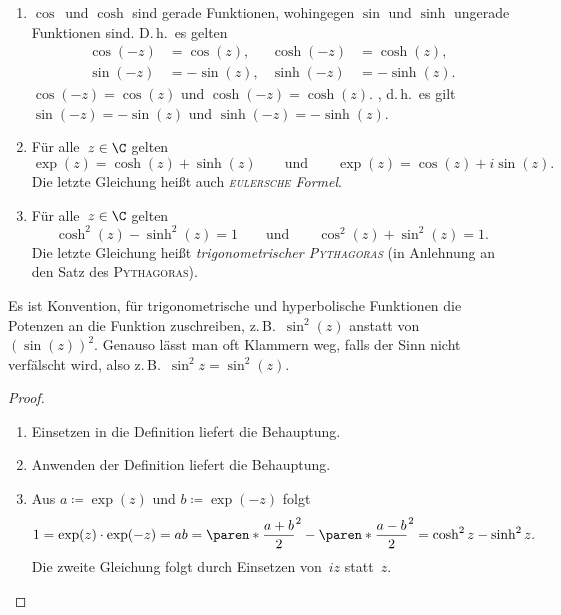\documentclass[a4paper]{article}
\begin{document}
\begin{proposition}\leavevmode
    \begin{enumerate}
        \item $\cos$~und $\cosh$ sind gerade Funktionen, wohingegen $\sin$ und $\sinh$ ungerade Funktionen sind. D.\,h.\ es gelten
              \begin{align*}
                  \cos(-z) & = \cos(z),  & \cosh(-z) & = \cosh(z),  \\
                  \sin(-z) & = -\sin(z), & \sinh(-z) & = -\sinh(z).
              \end{align*}
              $\cos(-z) = \cos(z)$ und $\cosh(-z) = \cosh(z)$. , d.\,h.\ es gilt $\sin(-z) = -\sin(z)$ und $\sinh(-z) = -\sinh(z)$.
        \item Für alle~$z \in \C$ gelten
              \begin{equation*}
                  \exp(z) = \cosh(z)+\sinh(z) \qquad\text{und}\qquad \exp(z) = \cos(z)+i\sin(z).
              \end{equation*}
              Die letzte Gleichung heißt auch \emph{\textsc{eulersche} Formel}.
        \item Für alle~$z \in \C$ gelten
              \begin{equation*}
                  \cosh^2(z) - \sinh^2(z) = 1 \qquad\text{und}\qquad \cos^2(z) + \sin^2(z) = 1.
              \end{equation*}
              Die letzte Gleichung heißt \emph{trigonometrischer \textsc{Pythagoras}} (in Anlehnung an den Satz des \textsc{Pythagoras}).
    \end{enumerate}
\end{proposition}

\begin{notation}
    Es ist Konvention, für trigonometrische und hyperbolische Funktionen die Potenzen an die Funktion zuschreiben, z.\,B.\ $\sin^2(z)$ anstatt von~$(\sin(z))^2$. Genauso lässt man oft Klammern weg, falls der Sinn nicht verfälscht wird, also z.\,B.\ $\sin^2 z = \sin^2(z)$.
\end{notation}

\begin{proof}\leavevmode
    \begin{enumerate}
        \item Einsetzen in die Definition liefert die Behauptung.
        \item Anwenden der Definition liefert die Behauptung.
        \item Aus $a \coloneqq \exp(z)$ und $b \coloneqq \exp(-z)$ folgt
              \begin{equation*}
                  1 = \exp(z)\cdot\exp(-z) = ab = \paren*{\frac{a+b}{2}}^2 - \paren*{\frac{a-b}{2}}^2 = \cosh^2z-\sinh^2z.
              \end{equation*}
              Die zweite Gleichung folgt durch Einsetzen von~$iz$ statt~$z$.\qedhere
    \end{enumerate}
\end{proof}
\end{document}
